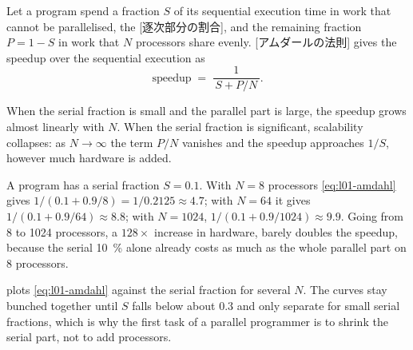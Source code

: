 \documentclass[../main.tex]{subfiles}
\begin{document}
\begin{definition}
  \label{def:l01-amdahl}
  Let a program spend a fraction $S$ of its sequential execution time in
  work that cannot be parallelised, the [逐次部分の割合],
  and the remaining fraction $P = 1 - S$ in work that $N$ processors
  share evenly.  [アムダールの法則] gives the
  speedup over the sequential execution as
  \begin{equation}
    \text{speedup} \;=\; \frac{1}{\,S + P/N\,}.
    \label{eq:l01-amdahl}
  \end{equation}
\end{definition}

When the serial fraction is small and the parallel part is large, the
speedup grows almost linearly with $N$.  When the serial fraction is
significant, scalability collapses: as $N \to \infty$ the term $P/N$
vanishes and the speedup approaches $1/S$, however much hardware is
added.

\begin{example}
  \label{ex:l01-amdahl}
  A program has a serial fraction $S = 0.1$.  With $N = 8$ processors
  \cref{eq:l01-amdahl} gives $1/(0.1 + 0.9/8) = 1/0.2125 \approx 4.7$;
  with $N = 64$ it gives $1/(0.1 + 0.9/64) \approx 8.8$; with
  $N = 1024$, $1/(0.1 + 0.9/1024) \approx 9.9$.  Going from 8 to 1024
  processors, a $128\times$ increase in hardware, barely doubles the
  speedup, because the serial \SI{10}{\percent} alone already costs as
  much as the whole parallel part on 8 processors.
\end{example}

 plots \cref{eq:l01-amdahl} against the serial
fraction for several $N$.  The curves stay bunched together until $S$
falls below about $0.3$ and only separate for small serial fractions,
which is why the first task of a parallel programmer is to shrink the
serial part, not to add processors.
\end{document}
